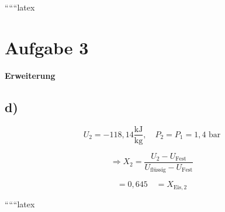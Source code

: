 ``````latex


\section*{Aufgabe 3}
\textbf{Erweiterung}

\subsection*{d)}

\[
U_2 = -118,14 \frac{\text{kJ}}{\text{kg}}, \quad P_2 = P_1 = 1,4 \text{ bar}
\]

\[
\Rightarrow X_2 = \frac{U_2 - U_{\text{Fest}}}{U_{\text{flüssig}} - U_{\text{Fest}}}
\]

\[
= 0,645 \quad = X_{\text{Eis},2}
\]

``````latex


